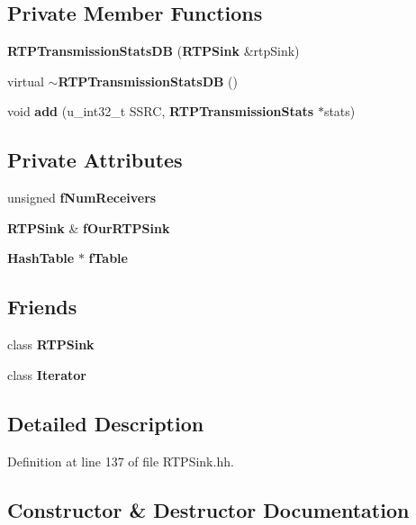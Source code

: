 \subsection*{Private Member Functions}
\begin{DoxyCompactItemize}
\item 
{\bf R\+T\+P\+Transmission\+Stats\+D\+B} ({\bf R\+T\+P\+Sink} \&rtp\+Sink)
\item 
virtual {\bf $\sim$\+R\+T\+P\+Transmission\+Stats\+D\+B} ()
\item 
void {\bf add} (u\+\_\+int32\+\_\+t S\+S\+R\+C, {\bf R\+T\+P\+Transmission\+Stats} $\ast$stats)
\end{DoxyCompactItemize}
\subsection*{Private Attributes}
\begin{DoxyCompactItemize}
\item 
unsigned {\bf f\+Num\+Receivers}
\item 
{\bf R\+T\+P\+Sink} \& {\bf f\+Our\+R\+T\+P\+Sink}
\item 
{\bf Hash\+Table} $\ast$ {\bf f\+Table}
\end{DoxyCompactItemize}
\subsection*{Friends}
\begin{DoxyCompactItemize}
\item 
class {\bf R\+T\+P\+Sink}
\item 
class {\bf Iterator}
\end{DoxyCompactItemize}


\subsection{Detailed Description}


Definition at line 137 of file R\+T\+P\+Sink.\+hh.



\subsection{Constructor \& Destructor Documentation}
